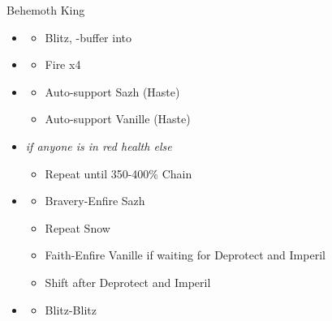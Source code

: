 \begin{battle}[0:53]{Behemoth King}
	\begin{itemize}
		\item \second
		      \begin{itemize}
			      \item Blitz, \rav-buffer into
		      \end{itemize}
		\item \sixth
		      \begin{itemize}
			      \item Fire x4
		      \end{itemize}
		\item \fourth
		      \begin{itemize}
			      \item Auto-support Sazh (Haste)
			      \item Auto-support Vanille (Haste)
		      \end{itemize}
		\item \fifth \textit{if anyone is in red health else} \sixth
		      \begin{itemize}
			      \item Repeat until 350-400\% Chain
		      \end{itemize}
		\item \third
		      \begin{itemize}
			      \item Bravery-Enfire Sazh
			      \item Repeat Snow
			      \item Faith-Enfire Vanille if waiting for Deprotect and Imperil
			      \item Shift after Deprotect and Imperil
		      \end{itemize}
		\item \second
		      \begin{itemize}
			      \item Blitz-Blitz
		      \end{itemize}
	\end{itemize}
\end{battle}
\vfill
